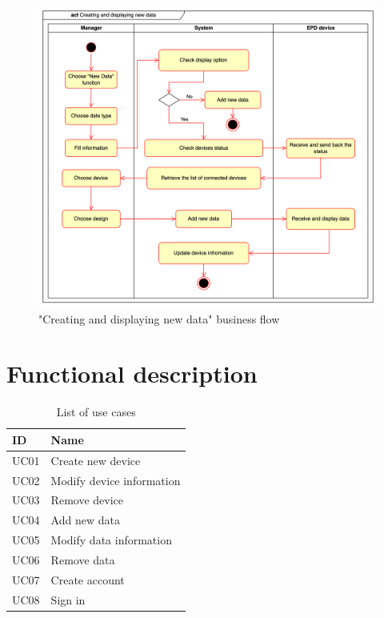 \documentclass[../Main.tex]{subfiles}
\begin{document}
\begin{figure}[H]
    \centering
    \includegraphics[scale=0.14]{doc/imgs/act_new-data.png}
    \caption{"Creating and displaying new data" business flow}
    \label{fig:act_new-data}
\end{figure}

\section{Functional description}
\label{section:2.3}
\begin{table}[H]
    \renewcommand{\arraystretch}{2} %
    \centering{}
    \fontsize{9pt}{8pt}\selectfont 
    \begin{tabular}{| m{2cm} | m{4cm} |}
        \hline
        \textbf{ID} & \textbf{Name}             \\ \hline
        UC01        & Create new device         \\ \hline
        UC02        & Modify device information \\ \hline
        UC03        & Remove device             \\ \hline
        UC04        & Add new data              \\ \hline
        UC05        & Modify data information   \\ \hline
        UC06        & Remove data               \\ \hline
        UC07        & Create account            \\ \hline
        UC08        & Sign in                   \\ \hline
    \end{tabular}
    \caption{List of use cases}
    \label{fig:table_uc}
\end{table}
\end{document}
